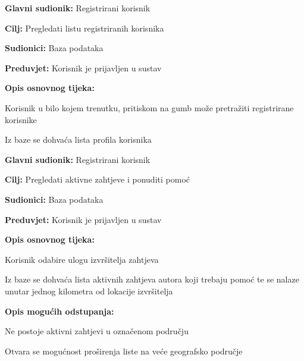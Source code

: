 \noindent {}
\begin{packed_item}
	\item \textbf{Glavni sudionik: }Registrirani korisnik
	\item  \textbf{Cilj:} Pregledati listu registriranih korisnika
	\item  \textbf{Sudionici:} Baza podataka
	\item  \textbf{Preduvjet:} Korisnik je prijavljen u sustav
	\item  \textbf{Opis osnovnog tijeka:}
	\item[] \begin{packed_enum}
		\item Korisnik u bilo kojem trenutku, pritiskom na gumb može pretražiti registrirane korisnike
		\item Iz baze se dohvaća lista profila korisnika
	\end{packed_enum}
\end{packed_item}
\newpage
\noindent {}
\begin{packed_item}
	\item \textbf{Glavni sudionik: }Registrirani korisnik
	\item  \textbf{Cilj:} Pregledati aktivne zahtjeve i ponuditi pomoć
	\item  \textbf{Sudionici:} Baza podataka
	\item  \textbf{Preduvjet:} Korisnik je prijavljen u sustav
	\item  \textbf{Opis osnovnog tijeka:}
	\item[] \begin{packed_enum}
		\item Korisnik odabire ulogu izvršitelja zahtjeva
		\item Iz baze se dohvaća lista aktivnih zahtjeva autora koji trebaju pomoć te se nalaze unutar jednog kilometra od lokacije izvršitelja
	\end{packed_enum}
	\item  \textbf{Opis mogućih odstupanja:}
	\item[] \begin{packed_item}
		\item[2.a] Ne postoje aktivni zahtjevi u označenom području
		\item[] \begin{packed_enum}
			\item Otvara se mogućnost proširenja liste na veće geografsko područje
		\end{packed_enum}
	\end{packed_item}
\end{packed_item}

